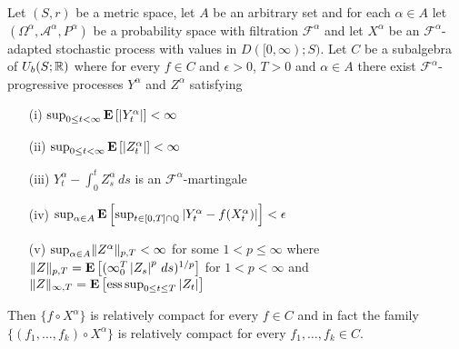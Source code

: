 \begin{thm}Let $(S,r)$ be a metric space, let $A$ be an arbitrary set and for each $\alpha \in A$ let $(\Omega^\alpha, \mathcal{A}^\alpha, P^\alpha)$ be a probability space with filtration $\mathcal{F}^\alpha$ and let $X^\alpha$ be an $\mathcal{F}^\alpha$-adapted stochastic process with values in $D([0,\infty); S)$.  Let $C$ be a subalgebra of $U_b(S; \mathbb{R})$ where for every $f \in C$ and $\epsilon > 0$, $T>0$ and $\alpha \in A$ there exist $\mathcal{F}^\alpha$-progressive processes $Y^\alpha$ and $Z^\alpha$ satisfying
\begin{itemize}
\item[(i)]$\sup_{0 \leq t < \infty} \textbf{E}\left[\left \vert Y^\alpha_t \right \vert\right] < \infty$
\item[(ii)]$\sup_{0 \leq t < \infty} \textbf{E}\left[\left \vert Z^\alpha_t \right \vert\right] < \infty$
\item[(iii)]$Y^\alpha_t - \int_0^t Z^\alpha_s \, ds$ is an $\mathcal{F}^\alpha$-martingale
\item[(iv)]$\sup_{\alpha \in A} \textbf{E}\left[\sup_{t \in [0,T] \cap \mathbb{Q}} \left \vert Y^\alpha_t - f(X^\alpha_t) \right \vert\right] < \epsilon$
\item[(v)]$\sup_{\alpha \in A} \lVert Z^\alpha \rVert_{p, T} < \infty$ for some $1 < p \leq \infty$ where $\lVert Z \rVert_{p, T} = \textbf{E}\left[(\infty_0^T \left \vert Z_s \right \vert^p \, ds)^{1/p}\right]$ for $1 < p < \infty$ and $\lVert Z \rVert_{\infty, T} = \textbf{E}\left[\operatorname*{ess\,sup}_{0 \leq t \leq T} \left \vert Z_t \right \vert\right]$
\end{itemize}
Then $\lbrace f \circ X^\alpha \rbrace$ is relatively compact for every $f \in C$ and in fact the family $\lbrace (f_1, \dotsc, f_k) \circ X^\alpha \rbrace$ is relatively compact for every $f_1, \dotsc, f_k \in C$.
\end{thm}
